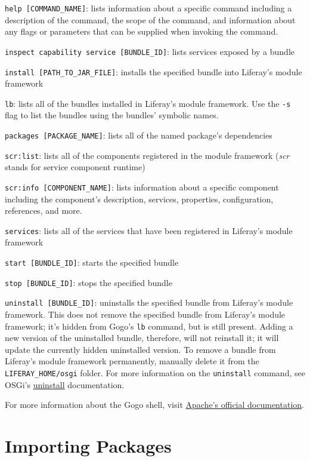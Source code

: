 \texttt{help\ {[}COMMAND\_NAME{]}}: lists information about a specific
command including a description of the command, the scope of the
command, and information about any flags or parameters that can be
supplied when invoking the command.

\texttt{inspect\ capability\ service\ {[}BUNDLE\_ID{]}}: lists services
exposed by a bundle

\texttt{install\ {[}PATH\_TO\_JAR\_FILE{]}}: installs the specified
bundle into Liferay's module framework

\texttt{lb}: lists all of the bundles installed in Liferay's module
framework. Use the \texttt{-s} flag to list the bundles using the
bundles' symbolic names.

\texttt{packages\ {[}PACKAGE\_NAME{]}}: lists all of the named package's
dependencies

\texttt{scr:list}: lists all of the components registered in the module
framework (\emph{scr} stands for service component runtime)

\texttt{scr:info\ {[}COMPONENT\_NAME{]}}: lists information about a
specific component including the component's description, services,
properties, configuration, references, and more.

\texttt{services}: lists all of the services that have been registered
in Liferay's module framework

\texttt{start\ {[}BUNDLE\_ID{]}}: starts the specified bundle

\texttt{stop\ {[}BUNDLE\_ID{]}}: stops the specified bundle

\texttt{uninstall\ {[}BUNDLE\_ID{]}}: uninstalls the specified bundle
from Liferay's module framework. This does not remove the specified
bundle from Liferay's module framework; it's hidden from Gogo's
\texttt{lb} command, but is still present. Adding a new version of the
uninstalled bundle, therefore, will not reinstall it; it will update the
currently hidden uninstalled version. To remove a bundle from Liferay's
module framework permanently, manually delete it from the
\texttt{LIFERAY\_HOME/osgi} folder. For more information on the
\texttt{uninstall} command, see OSGi's
\href{https://osgi.org/javadoc/r6/core/org/osgi/framework/Bundle.html\#uninstall()}{uninstall}
documentation.

For more information about the Gogo shell, visit
\href{http://felix.apache.org/documentation/subprojects/apache-felix-gogo.html}{Apache's
official documentation}.

\chapter{Importing Packages}\label{importing-packages}

